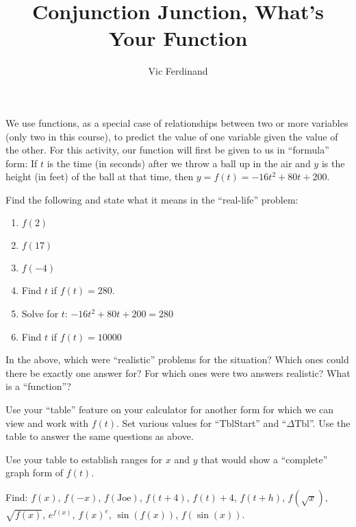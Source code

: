 \documentclass[nooutcomes]{ximera}
\author{Vic Ferdinand}
\title{Conjunction Junction, What's Your Function}
\begin{document}
\begin{abstract}




\end{abstract}
\maketitle



We use functions, as a special case of relationships between two or more variables (only two in this course), to predict the value of one variable given the value of the other.  For this activity, our function will first be given to us in ``formula'' form:  If $t$ is the time (in seconds) after we throw a ball up in the air and $y$ is the height (in feet) of the ball at that time, then  $y = f(t) = -16t^2+80t+200$.  


\begin{question} 
Find the following and state what it means in the ``real-life'' problem:
\begin{enumerate}
    \item $f(2)$
    \item $f(17)$
    \item $f(-4)$
    \item Find $t$ if $f(t) = 280$.
    \item Solve for $t$: $-16t^2+80t+200 = 280$
    \item Find $t$ if $f(t) = 10000$
\end{enumerate}
\end{question}


In the above, which were ``realistic'' problems for the situation?  Which ones could there be exactly one answer for?  For which ones were two answers realistic?  What is a ``function''?

\begin{question} 
Use your ``table'' feature on your calculator for another form for which we can view and work with $f(t)$.  Set various values for ``TblStart'' and ``$\Delta \text{Tbl}$''.  Use the table to answer the same questions as above.
\end{question}

\begin{question} 
Use your table to establish ranges for $x$ and $y$ that would show a ``complete'' graph form of $f(t)$.
\end{question}
\begin{question} \label{ConjunctionJunction4}
Find:   $f(x)$, $f(-x)$, $f(\text{Joe})$, $f(t+4)$, $f(t) + 4$, $f(t+h)$, $f(\sqrt{x})$, $\sqrt{f(x)}$, $e^{f(x)}$, $f(x)^e$, $\sin(f(x))$, $f(\sin(x))$.

\end{question}
\end{document}
